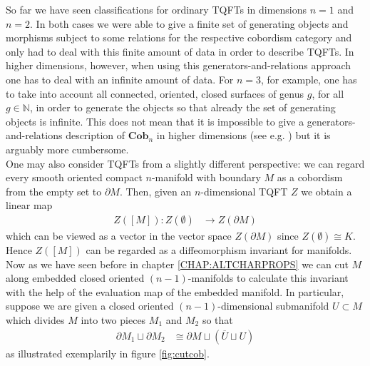 So far we have seen classifications for ordinary TQFTs in dimensions $n = 1$ and $n = 2$. In both cases we were able to give a finite set of generating objects and morphisms subject to some relations for the respective cobordism category and only had to deal with this finite amount of data in order to describe TQFTs. In higher dimensions, however, when using this generators-and-relations approach one has to deal with an infinite amount of data. For $n = 3$, for example, one has to take into account all connected, oriented, closed surfaces of genus $g$, for all $g \in \mathbb{N}$, in order to generate the objects so that already the set of generating objects is infinite. This does not mean that it is impossible to give a generators-and-relations description of $\mathbf{Cob}_{n}$ in higher dimensions (see e.g. \cite{904e5e6a}) but it is arguably more cumbersome.
\\
One may also consider TQFTs from a slightly different perspective: we can regard every smooth oriented compact $n$-manifold with boundary $M$ as a cobordism from the empty set to $\partial M$. Then, given an $n$-dimensional TQFT $Z$ we obtain a linear map
\begin{align*}
  Z([M])
  \colon
  Z(\emptyset)
  &\to
  Z(\partial M)
\end{align*}
which can be viewed as a vector in the vector space $Z(\partial M)$ since $Z(\emptyset) \cong K$. Hence $Z([M])$ can be regarded as a diffeomorphism invariant for manifolds. Now as we have seen before in chapter \ref{CHAP:ALTCHARPROPS} we can cut $M$ along embedded closed oriented $(n-1)$-manifolds to calculate this invariant with the help of the evaluation map of the embedded manifold. In particular, suppose we are given a closed oriented $(n-1)$-dimensional submanifold $U \subset M$ which divides $M$ into two pieces $M_{1}$ and $M_{2}$ so that
\begin{align*}
  \partial M_{1}
  \sqcup
  \partial M_{2}
  &\cong
  \partial M
  \sqcup
  \left(
    \overline{U}
    \sqcup
    U
  \right)
\end{align*}
as illustrated exemplarily in figure \ref{fig:cutcob}.
\\
